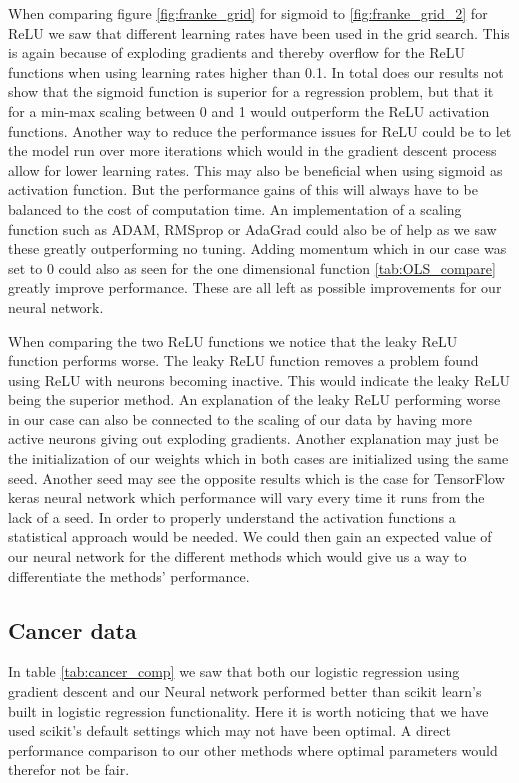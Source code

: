 \documentclass[11pt]{article}
\begin{document}
When comparing figure \ref{fig:franke_grid} for sigmoid to \ref{fig:franke_grid_2} for ReLU we saw that different learning rates have been used in the grid search. This is again because of exploding gradients and thereby overflow for the ReLU functions when using learning rates higher than 0.1. In total does our results not show that the sigmoid function is superior for a regression problem, but that it for a min-max scaling between 0 and 1 would outperform the ReLU activation functions. Another way to reduce the performance issues for ReLU could be to let the model run over more iterations which would in the gradient descent process allow for lower learning rates. This may also be beneficial when using sigmoid as activation function. But the performance gains of this will always have to be balanced to the cost of computation time. An implementation of a scaling function such as ADAM, RMSprop or AdaGrad could also be of help as we saw these greatly outperforming no tuning. Adding momentum which in our case was set to 0 could also as seen for the one dimensional function \ref{tab:OLS_compare} greatly improve performance. These are all left as possible improvements for our neural network.

When comparing the two ReLU functions we notice that the leaky ReLU function performs worse. The leaky ReLU function removes a problem found using ReLU with neurons becoming inactive. This would indicate the leaky ReLU being the superior method. An explanation of the leaky ReLU performing worse in our case can also be connected to the scaling of our data by having more active neurons giving out exploding gradients. Another explanation may just be the initialization of our weights which in both cases are initialized using the same seed. Another seed may see the opposite results which is the case for TensorFlow keras neural network which performance will vary every time it runs from the lack of a seed. In order to properly understand the activation functions a statistical approach would be needed. We could then gain an expected value of our neural network for the different methods which would give us a way to differentiate the methods' performance.

\subsection{Cancer data}
In table \ref{tab:cancer_comp} we saw that both our logistic regression using gradient descent and our Neural network performed better than scikit learn's built in logistic regression functionality. Here it is worth noticing that we have used scikit's default settings which may not have been optimal. A direct performance comparison to our other methods where optimal parameters would therefor not be fair.
\end{document}
